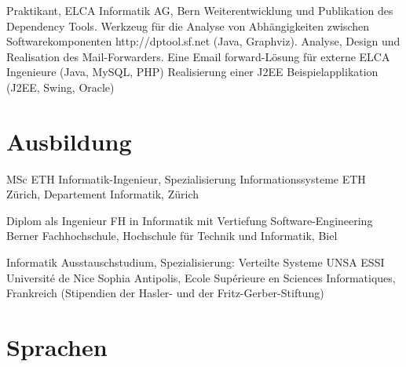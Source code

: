 \documentclass[10pt]{moderncv}
\begin{document}
{Praktikant, ELCA Informatik AG, Bern}
{Weiterentwicklung und Publikation des Dependency Tools. 
Werkzeug f\"ur die Analyse von Abh\"angigkeiten zwischen Softwarekomponenten http://dptool.sf.net (Java, Graphviz).\smallpara
Analyse, Design und Realisation des Mail-Forwarders. Eine Email forward-L\"osung f\"ur externe ELCA Ingenieure (Java, MySQL, PHP)\smallpara
Realisierung einer J2EE Beispielapplikation (J2EE, Swing, Oracle)}


\section{Ausbildung}

  {MSc ETH Informatik-Ingenieur, Spezialisierung Informationssysteme}
                              {ETH Z\"urich, Departement Informatik, Z\"urich}

    {Diplom als Ingenieur FH in Informatik mit Vertiefung Software-Engineering}
                                {Berner Fachhochschule, Hochschule f\"ur Technik und Informatik, Biel}

    {Informatik Ausstauschstudium, Spezialisierung: Verteilte Systeme}
                                {UNSA ESSI Universit\'e de Nice Sophia Antipolis, Ecole Sup\'erieure en Sciences Informatiques, Frankreich
                                \small (Stipendien der Hasler- und der Fritz-Gerber-Stiftung)}

\section{Sprachen}
\end{document}
